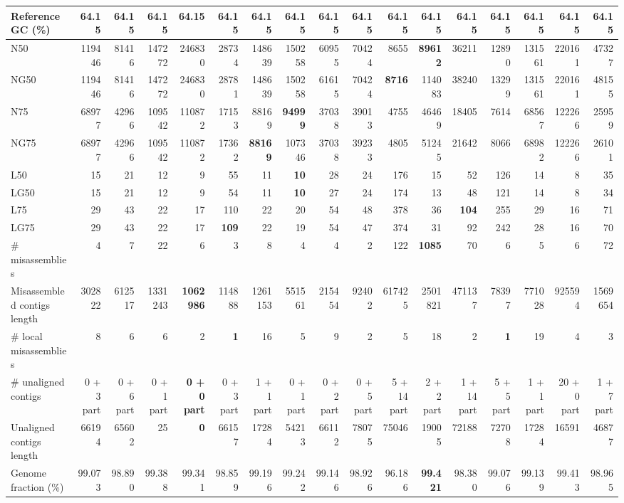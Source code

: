 \documentclass[12pt,a4paper]{article}
\begin{document}
\begin{table}[ht]
\begin{center}
\begin{tabular}{|l*{16}{|r}|}
Reference GC (\%) & 64.15 & 64.15 & 64.15 & 64.15 & 64.15 & 64.15 & 64.15 & 64.15 & 64.15 & 64.15 & 64.15 & 64.15 & 64.15 & 64.15 & 64.15 & 64.15 \\ \hline
N50 & 119446 & 81416 & 147272 & 246830 & 28734 & 148639 & 150258 & 60955 & 70424 & 8655 & {\bf 89612} & 36211 & 12890 & 131561 & 220161 & 47327 \\ \hline
NG50 & 119446 & 81416 & 147272 & 246830 & 28781 & 148639 & 150258 & 61615 & 70424 & {\bf 8716} & 114083 & 38240 & 13299 & 131561 & 220161 & 48155 \\ \hline
N75 & 68977 & 42966 & 109542 & 110872 & 17153 & 88169 & {\bf 94999} & 37038 & 39013 & 4755 & 46469 & 18405 & 7614 & 68567 & 122266 & 25959 \\ \hline
NG75 & 68977 & 42966 & 109542 & 110872 & 17362 & {\bf 88169} & 107346 & 37038 & 39233 & 4805 & 51245 & 21642 & 8066 & 68982 & 122266 & 26101 \\ \hline
L50 & 15 & 21 & 12 & 9 & 55 & 11 & {\bf 10} & 28 & 24 & 176 & 15 & 52 & 126 & 14 & 8 & 35 \\ \hline
LG50 & 15 & 21 & 12 & 9 & 54 & 11 & {\bf 10} & 27 & 24 & 174 & 13 & 48 & 121 & 14 & 8 & 34 \\ \hline
L75 & 29 & 43 & 22 & 17 & 110 & 22 & 20 & 54 & 48 & 378 & 36 & {\bf 104} & 255 & 29 & 16 & 71 \\ \hline
LG75 & 29 & 43 & 22 & 17 & {\bf 109} & 22 & 19 & 54 & 47 & 374 & 31 & 92 & 242 & 28 & 16 & 70 \\ \hline
\# misassemblies & 4 & 7 & 22 & 6 & 3 & 8 & 4 & 4 & 2 & 122 & {\bf 1085} & 70 & 6 & 5 & 6 & 72 \\ \hline
Misassembled contigs length & 302822 & 612517 & 1331243 & {\bf 1062986} & 114888 & 1261153 & 551561 & 215454 & 92402 & 617425 & 2501821 & 471137 & 78397 & 771028 & 925594 & 1569654 \\ \hline
\# local misassemblies & 8 & 6 & 6 & 2 & {\bf 1} & 16 & 5 & 9 & 2 & 5 & 18 & 2 & {\bf 1} & 19 & 4 & 3 \\ \hline
\# unaligned contigs & 0 + 3 part & 0 + 6 part & 0 + 1 part & {\bf 0 + 0 part} & 0 + 3 part & 1 + 1 part & 0 + 1 part & 0 + 2 part & 0 + 5 part & 5 + 14 part & 2 + 2 part & 1 + 14 part & 5 + 5 part & 1 + 1 part & 20 + 0 part & 1 + 7 part \\ \hline
Unaligned contigs length & 66194 & 65602 & 25 & {\bf 0} & 66157 & 17284 & 54213 & 66112 & 78075 & 75046 & 19005 & 72188 & 72708 & 17284 & 16591 & 46877 \\ \hline
Genome fraction (\%) & 99.073 & 98.890 & 99.388 & 99.341 & 98.859 & 99.196 & 99.242 & 99.146 & 98.926 & 96.186 & {\bf 99.421} & 98.380 & 99.076 & 99.139 & 99.413 & 98.965 \\ \hline

\end{tabular}
\end{center}
\end{table}
\end{document}
